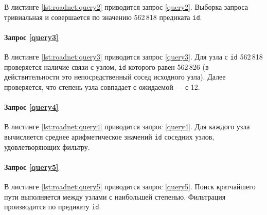 В листинге \ref{lst:roadnet:query2} приводится запрос \ref{query2}. Выборка запроса тривиальная и совершается по
значению 562\,818 предиката \texttt{id}.

\paragraph{Запрос \ref{query3}}

В листинге \ref{lst:roadnet:query3} приводится запрос \ref{query3}. Для узла с \texttt{id} 562\,818 проверяется наличие
связи с узлом, \texttt{id} которого равен 562\,826 (в действительности это непосредственный сосед исходного узла). Далее
проверяется, что степень узла совпадает с ожидаемой --- с 12.

\paragraph{Запрос \ref{query4}}

В листинге \ref{lst:roadnet:query4} приводится запрос \ref{query4}. Для каждого узла вычисляется среднее арифметическое
значений \texttt{id} соседних узлов, удовлетворяющих фильтру.

\paragraph{Запрос \ref{query5}}

В листинге \ref{lst:roadnet:query5} приводится запрос \ref{query5}. Поиск кратчайшего пути выполняется между узлами с
наибольшей степенью. Фильтрация производится по предикату \texttt{id}.

